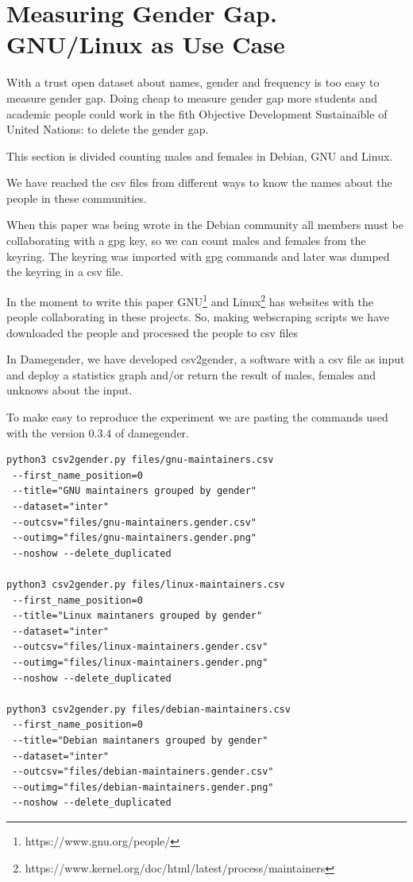 \documentclass[a4paper]{article}
\begin{document}
\section{Measuring Gender Gap. GNU/Linux as Use Case}
\label{sec:measuring}

With a trust open dataset about names, gender and frequency is too
easy to measure gender gap. Doing cheap to measure gender gap more
students and academic people could work in the fith Objective
Development Sustainaible of United Nations: to delete the gender gap.

This section is divided counting males and females in Debian, GNU and
Linux.

We have reached the csv files from different ways to know the names
about the people in these communities.

When this paper was being wrote in the Debian community all members
must be collaborating with a gpg key, so we can count males and females
from the keyring. The keyring was imported with gpg commands and later
was dumped the keyring in a csv file.

In the moment to write this paper
GNU\footnote{https://www.gnu.org/people/} and
Linux\footnote{https://www.kernel.org/doc/html/latest/process/maintainers}
has websites with the people collaborating in these projects. So,
making webscraping scripts we have downloaded the people and processed
the people to csv files

In Damegender, we have developed csv2gender, a software with a csv
file as input and deploy a statistics graph and/or return the result
of males, females and unknows about the input.

To make easy to reproduce the experiment we are pasting the commands
used with the version 0.3.4 of damegender.

\begin{verbatim}
python3 csv2gender.py files/gnu-maintainers.csv
 --first_name_position=0 
 --title="GNU maintainers grouped by gender"
 --dataset="inter" 
 --outcsv="files/gnu-maintainers.gender.csv"
 --outimg="files/gnu-maintainers.gender.png" 
 --noshow --delete_duplicated

python3 csv2gender.py files/linux-maintainers.csv
 --first_name_position=0 
 --title="Linux maintaners grouped by gender"
 --dataset="inter" 
 --outcsv="files/linux-maintainers.gender.csv"
 --outimg="files/linux-maintainers.gender.png" 
 --noshow --delete_duplicated

python3 csv2gender.py files/debian-maintainers.csv
 --first_name_position=0 
 --title="Debian maintaners grouped by gender"
 --dataset="inter" 
 --outcsv="files/debian-maintainers.gender.csv"
 --outimg="files/debian-maintainers.gender.png" 
 --noshow --delete_duplicated
\end{verbatim}
\end{document}
